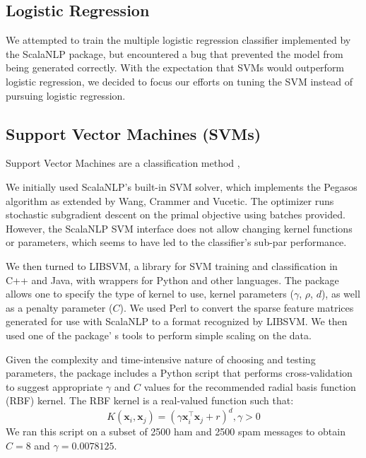 \documentclass[preprint]{acm_proc_article-sp}
\begin{document}
\subsection{Logistic Regression}

We attempted to train the multiple logistic regression classifier implemented by the ScalaNLP package, but encountered a bug that prevented the model from being generated correctly. With the expectation that SVMs would outperform logistic regression, we decided to focus our efforts on tuning the SVM instead of pursuing logistic regression. 


\subsection{Support Vector Machines (SVMs)}


Support Vector Machines are a classification method \cite{boser}, \cite{cortesv95} 

We initially used ScalaNLP's built-in SVM solver, which implements the Pegasos algorithm \cite{pegasos} as extended 
by Wang, Crammer and Vucetic\cite{wang2}. The optimizer runs stochastic subgradient descent on the primal objective 
using batches provided. However, the ScalaNLP SVM interface does not allow changing kernel functions or parameters, 
which seems to have led to the classifier's sub-par performance.

We then turned to LIBSVM, a library for SVM training and classification in C++ and Java, with wrappers for 
Python and other languages. The package allows one to specify the type of kernel to use, kernel parameters 
($\gamma$, $\rho$, $d$), as well as a penalty parameter ($C$). We used Perl to convert the sparse feature 
matrices generated for use with ScalaNLP to a format recognized by LIBSVM. We then used one of the package'
s tools to perform simple scaling on the data. 

Given the complexity and time-intensive nature of choosing and testing parameters, the 
package includes a Python script that performs cross-validation to suggest appropriate 
$\gamma$ and $C$ values for the recommended radial basis function (RBF) kernel. The RBF kernel is 
a real-valued function such that: 
$$K(\mathbf{x}_i, \mathbf{x}_j) = (\gamma\mathbf{x}_i^\intercal\mathbf{x}_j+r)^d, \gamma>0$$
We ran this script on a subset of 2500 ham and 2500 spam messages to obtain $C = 8$ and $\gamma = 0.0078125$.
\end{document}
